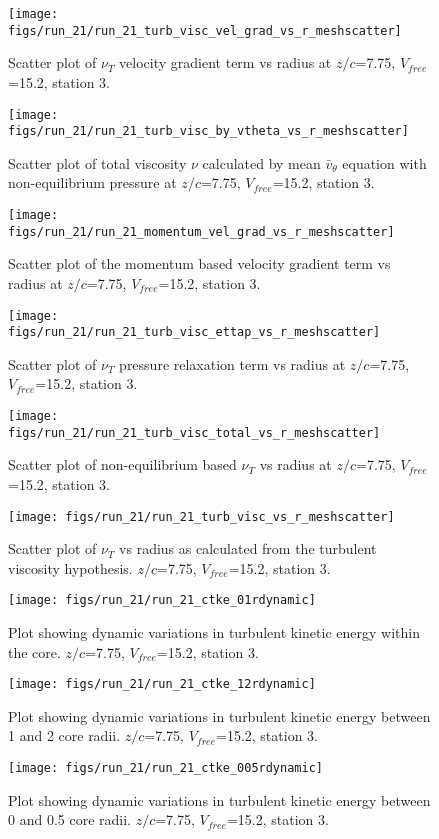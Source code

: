 \begin{figure}[H]
\centering
\texttt{[image: figs/run\_21/run\_21\_turb\_visc\_vel\_grad\_vs\_r\_meshscatter]}
\caption{Scatter plot of $\nu_T$ velocity gradient term vs radius at $z/c$=7.75, $V_{free}$=15.2, station 3.}
\end{figure}


\begin{figure}[H]
\centering
\texttt{[image: figs/run\_21/run\_21\_turb\_visc\_by\_vtheta\_vs\_r\_meshscatter]}
\caption{Scatter plot of total viscosity $\nu$ calculated by mean $\bar{v}_{\theta}$ equation with non-equilibrium pressure at $z/c$=7.75, $V_{free}$=15.2, station 3.}
\end{figure}


\begin{figure}[H]
\centering
\texttt{[image: figs/run\_21/run\_21\_momentum\_vel\_grad\_vs\_r\_meshscatter]}
\caption{Scatter plot of the momentum based velocity gradient term vs radius at $z/c$=7.75, $V_{free}$=15.2, station 3.}
\end{figure}


\begin{figure}[H]
\centering
\texttt{[image: figs/run\_21/run\_21\_turb\_visc\_ettap\_vs\_r\_meshscatter]}
\caption{Scatter plot of $\nu_T$ pressure relaxation term vs radius at $z/c$=7.75, $V_{free}$=15.2, station 3.}
\end{figure}


\begin{figure}[H]
\centering
\texttt{[image: figs/run\_21/run\_21\_turb\_visc\_total\_vs\_r\_meshscatter]}
\caption{Scatter plot of non-equilibrium based $\nu_T$ vs radius at $z/c$=7.75, $V_{free}$=15.2, station 3.}
\end{figure}


\begin{figure}[H]
\centering
\texttt{[image: figs/run\_21/run\_21\_turb\_visc\_vs\_r\_meshscatter]}
\caption{Scatter plot of $\nu_T$ vs radius as calculated from the turbulent viscosity hypothesis. $z/c$=7.75, $V_{free}$=15.2, station 3.}
\end{figure}


\begin{figure}[H]
\centering
\texttt{[image: figs/run\_21/run\_21\_ctke\_01rdynamic]}
\caption{Plot showing dynamic variations in turbulent kinetic energy within the core. $z/c$=7.75, $V_{free}$=15.2, station 3.}
\end{figure}


\begin{figure}[H]
\centering
\texttt{[image: figs/run\_21/run\_21\_ctke\_12rdynamic]}
\caption{Plot showing dynamic variations in turbulent kinetic energy between 1 and 2 core radii. $z/c$=7.75, $V_{free}$=15.2, station 3.}
\end{figure}


\begin{figure}[H]
\centering
\texttt{[image: figs/run\_21/run\_21\_ctke\_005rdynamic]}
\caption{Plot showing dynamic variations in turbulent kinetic energy between 0 and 0.5 core radii. $z/c$=7.75, $V_{free}$=15.2, station 3.}
\end{figure}



